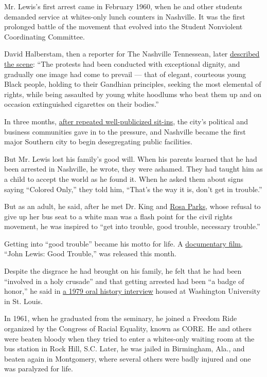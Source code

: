 Mr. Lewis's first arrest came in February 1960, when he and other
students demanded service at whites-only lunch counters in Nashville. It
was the first prolonged battle of the movement that evolved into the
Student Nonviolent Coordinating Committee.

David Halberstam, then a reporter for The Nashville Tennessean, later
\href{https://www.nytimes.com/1995/05/01/opinion/nashville-revisited-lunchcounter-days.html}{described
the scene}: ``The protests had been conducted with exceptional dignity,
and gradually one image had come to prevail --- that of elegant,
courteous young Black people, holding to their Gandhian principles,
seeking the most elemental of rights, while being assaulted by young
white hoodlums who beat them up and on occasion extinguished cigarettes
on their bodies.''

In three months,
\href{https://www.blackpast.org/african-american-history/nashville-sit-ins-1960/}{after
repeated well-publicized sit-ins}, the city's political and business
communities gave in to the pressure, and Nashville became the first
major Southern city to begin desegregating public facilities.

But Mr. Lewis lost his family's good will. When his parents learned that
he had been arrested in Nashville, he wrote, they were ashamed. They had
taught him as a child to accept the world as he found it. When he asked
them about signs saying ``Colored Only,'' they told him, ``That's the
way it is, don't get in trouble.''

But as an adult, he said, after he met Dr. King and
\href{https://www.nytimes.com/2005/10/25/us/rosa-parks-92-founding-symbol-of-civil-rights-movement-dies.html}{Rosa
Parks}, whose refusal to give up her bus seat to a white man was a flash
point for the civil rights movement, he was inspired to ``get into
trouble, good trouble, necessary trouble.''

Getting into ``good trouble'' became his motto for life. A
\href{https://variety.com/2019/film/news/john-lewis-documentary-cnn-films-1203434157/}{documentary
film,} ``John Lewis: Good Trouble,'' was released this month.

Despite the disgrace he had brought on his family, he felt that he had
been ``involved in a holy crusade'' and that getting arrested had been
``a badge of honor,'' he said in
\href{http://repository.wustl.edu/concern/videos/vt150m28q}{a 1979 oral
history interview} housed at Washington University in St. Louis.

In 1961, when he graduated from the seminary, he joined a Freedom Ride
organized by the Congress of Racial Equality, known as CORE. He and
others were beaten bloody when they tried to enter a whites-only waiting
room at the bus station in Rock Hill, S.C. Later, he was jailed in
Birmingham, Ala., and beaten again in Montgomery, where several others
were badly injured and one was paralyzed for life.

